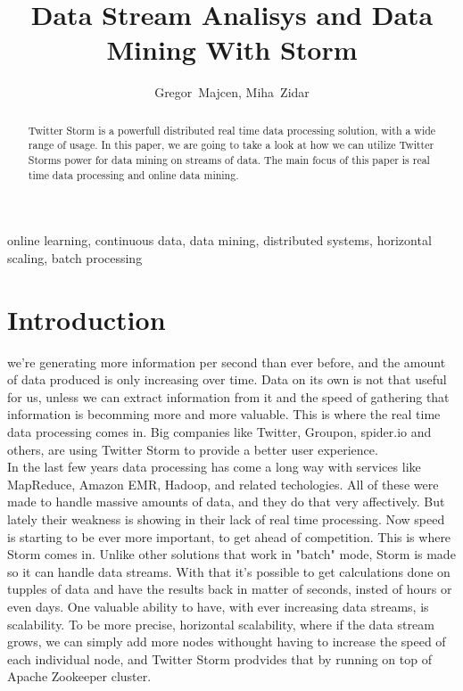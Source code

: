 \documentclass[journal]{IEEEtran/IEEEtran}
\begin{document}
\title{Data Stream Analisys and Data Mining With Storm}

\author{Gregor~Majcen, Miha~Zidar}%
\maketitle
\begin{abstract}
    Twitter Storm is a powerfull distributed real time data processing solution, with a wide range of usage. In this paper, we are going to take a look at how we can utilize Twitter Storms power for data mining on streams of data. The main focus of this paper is real time data processing and online data mining.
\end{abstract}

\begin{IEEEkeywords}
    online learning, continuous data, data mining, distributed systems, horizontal scaling, batch processing
\end{IEEEkeywords}

\IEEEpeerreviewmaketitle


\section{Introduction}
 we're generating more information per second than ever before, and the amount of data produced is only increasing over time. Data on its own is not that useful for us, unless we can extract information from it and the speed of gathering that information is becomming more and more valuable. This is where the real time data processing comes in. Big companies like Twitter, Groupon, spider.io and others, are using Twitter Storm to provide a better user experience.\\

In the last few years data processing has come a long way with services like MapReduce, Amazon EMR, Hadoop, and related techologies. All of these were made to handle massive amounts of data, and they do that very affectively. But lately their weakness is showing in their lack of real time processing. Now speed is starting to be ever more important, to get ahead of competition. This is where Storm comes in. Unlike other solutions that work in "batch" mode, Storm is made so it can handle data streams. With that it's possible to get calculations done on tupples of data and have the results back in matter of seconds, insted of hours or even days. One valuable ability to have, with ever increasing data streams, is scalability. To be more precise, horizontal scalability, where if the data stream grows, we can simply add more nodes withought having to increase the speed of each individual node, and Twitter Storm prodvides that by running on top of Apache Zookeeper cluster.
\end{document}
